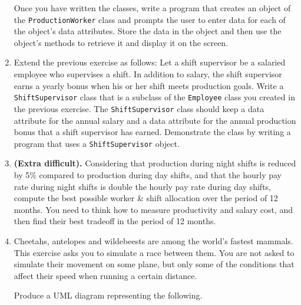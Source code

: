 \documentclass[a4paper,12pt]{article}
\begin{document}
\begin{enumerate}[label=11ø.\arabic*,start=0]
  Once you have written the classes, write a program that creates an object of the \texttt{ProductionWorker} class and prompts the user to enter data for each of the object's data attributes. Store the data in the object and then use the object's methods to retrieve it and display it on the screen.
  
\item Extend the previous exercise as follows: Let a shift supervisor be a salaried employee who supervises a shift. In addition to salary, the shift supervisor earns a yearly bonus when his or her shift meets production goals. Write a \texttt{ShiftSupervisor} class that is a subclass of the \texttt{Employee} class you created in the previous exercise. The \texttt{ShiftSupervisor} class should keep a data attribute for the annual salary and a data attribute for the annual production bonus that a shift supervisor has earned. Demonstrate the class by writing a program that uses a \texttt{ShiftSupervisor} object.
  
\item \textbf{(Extra difficult).} Considering that production during night shifts is reduced by 5\% compared to production during day shifts, and that the hourly pay rate during night shifts is double the hourly pay rate during day shifts, compute the best possible worker \& shift allocation over the period of 12 months. You need to think how to measure productivity and salary cost, and then find their best tradeoff in the period of 12 months.
  
\item Cheetahs, antelopes and wildebeests are among the world's fastest mammals. This exercise asks you to simulate a race between them. You are not asked to simulate their movement on some plane, but only some of the conditions that affect their speed when running a certain distance. 
  
  Produce a UML diagram representing the following.
  

\end{enumerate}
\end{document}
